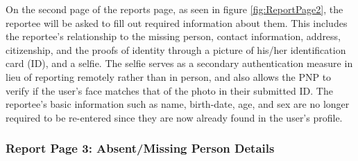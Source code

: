 On the second page of the reports page, as seen in figure \ref{fig:ReportPage2}, the reportee will be asked to fill out required information about them. This includes the reportee's relationship to the missing person, contact information, address, citizenship, and the proofs of identity through a picture of his/her identification card (ID), and a selfie. The selfie serves as a secondary authentication measure in lieu of reporting remotely rather than in person, and also allows the PNP to verify if the user's face matches that of the photo in their submitted ID. The reportee's basic information such as name, birth-date, age, and sex are no longer required to be re-entered since they are now already found in the user's profile. 

\subsubsection{Report Page 3: Absent/Missing Person Details}

